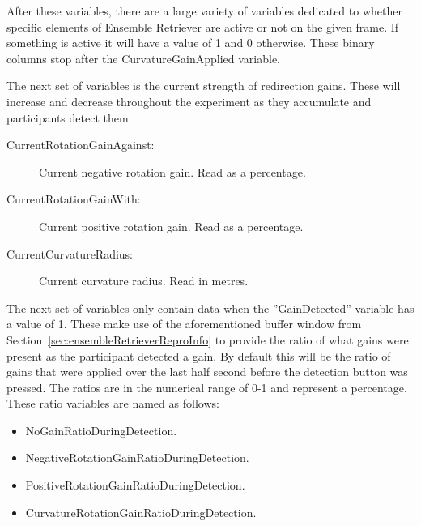 After these variables, there are a large variety of variables dedicated to whether specific elements of Ensemble Retriever are active or not on the given frame. If something is active it will have a value of 1 and 0 otherwise. These binary columns stop after the CurvatureGainApplied variable. 

The next set of variables is the current strength of redirection gains. These will increase and decrease throughout the experiment as they accumulate and participants detect them:
\begin{description}
   \item[CurrentRotationGainAgainst:] Current negative rotation gain. Read as a percentage.
   \item[CurrentRotationGainWith:] Current positive rotation gain. Read as a percentage.
   \item[CurrentCurvatureRadius:] Current curvature radius. Read in metres. 
\end{description}

The next set of variables only contain data when the ''GainDetected'' variable has a value of 1. These make use of the aforementioned buffer window from Section~\ref{sec:ensembleRetrieverReproInfo} to provide the ratio of what gains were present as the participant detected a gain. By default this will be the ratio of gains that were applied over the last half second before the detection button was pressed. The ratios are in the numerical range of 0-1 and represent a percentage. These ratio variables are named as follows:

\begin{itemize}
    \item NoGainRatioDuringDetection.
    \item NegativeRotationGainRatioDuringDetection.
    \item PositiveRotationGainRatioDuringDetection.
    \item CurvatureRotationGainRatioDuringDetection.
\end{itemize}


